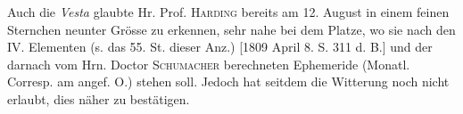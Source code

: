 \par\indent Auch die \emph{Vesta} glaubte Hr. Prof. \textsc{Harding} bereits am 12. August in einem feinen Sternchen neunter Grösse zu erkennen, sehr nahe bei dem Platze, wo sie nach den IV. Elementen (s. das 55. St. dieser Anz.) [1809 April 8. S. 311 d. B.] und der darnach vom Hrn. Doctor \textsc{Schumacher} berechneten Ephemeride (Monatl. Corresp. am angef. O.) stehen soll. Jedoch hat seitdem die Witterung noch nicht erlaubt, dies näher zu bestätigen.
